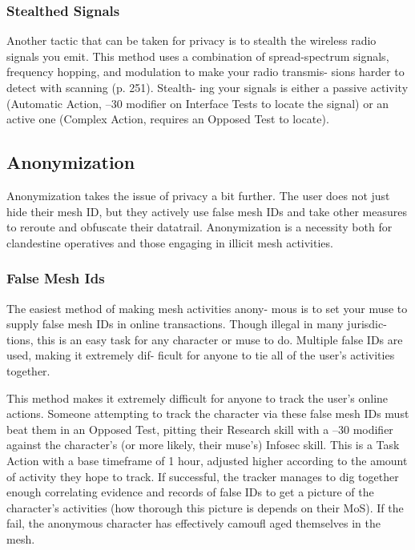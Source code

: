 \subsubsection{Stealthed Signals}

Another tactic that can be taken for privacy is to stealth 
the wireless radio signals you emit. This method uses 
a combination of spread-spectrum signals, frequency 
hopping, and modulation to make your radio transmis-
sions harder to detect with scanning (p. 251). Stealth-
ing your signals is either a passive activity (Automatic 
Action, –30 modifier on Interface Tests to locate the 
signal) or an active one (Complex Action, requires an 
Opposed Test to locate).

\subsection{Anonymization}

Anonymization takes the issue of privacy a bit further. 
The user does not just hide their mesh ID, but they 
actively use false mesh IDs and take other measures to 
reroute and obfuscate their datatrail. Anonymization 
is a necessity both for clandestine operatives and those 
engaging in illicit mesh activities.

\subsubsection{False Mesh Ids}

The easiest method of making mesh activities anony-
mous is to set your muse to supply false mesh IDs in 
online transactions. Though illegal in many jurisdic-
tions, this is an easy task for any character or muse to 
do. Multiple false IDs are used, making it extremely dif-
ficult for anyone to tie all of the user's activities together.

This method makes it extremely difficult for anyone 
to track the user's online actions. Someone attempting 
to track the character via these false mesh IDs must 
beat them in an Opposed Test, pitting their Research 
skill with a –30 modifier against the character's (or 
more likely, their muse's) Infosec skill. This is a Task 
Action with a base timeframe of 1 hour, adjusted 
higher according to the amount of activity they hope 
to track. If successful, the tracker manages to dig 
together enough correlating evidence and records of 
false IDs to get a picture of the character's activities 
(how thorough this picture is depends on their MoS). 
If the fail, the anonymous character has effectively 
camoufl aged themselves in the mesh.

